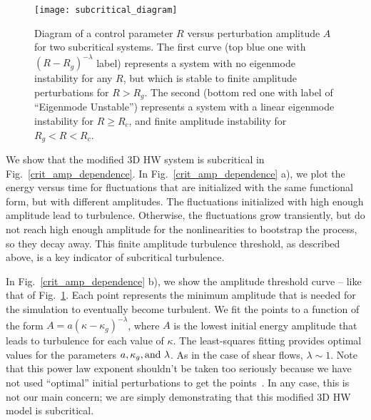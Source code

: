 \documentclass[twocolumn,showkeys,superscriptaddress]{revtex4}
\begin{document}
\begin{figure}
\centerline{\texttt{[image: subcritical\_diagram]}}
\caption{Diagram of a control parameter $R$ versus perturbation amplitude $A$ for two subcritical systems. The first curve (top blue one with $(R-R_g)^{-\lambda}$ label) represents a system with no
eigenmode instability for any $R$, but which is stable to finite amplitude perturbations for $R > R_g$. 
The second (bottom red one with label of ``Eigenmode Unstable'') represents a system with a linear eigenmode instability for $R \ge R_c$, and finite amplitude
instability for $R_g < R < R_c$.}
\label{subcritical_diagram}
\end{figure}

We show that the modified 3D HW system is subcritical in Fig.~\ref{crit_amp_dependence}. In Fig.~\ref{crit_amp_dependence} a), we plot the energy versus time for fluctuations that are initialized with the same functional form, but with
different amplitudes.
The fluctuations initialized with high enough amplitude lead to turbulence. 
Otherwise, the fluctuations grow transiently, but do not reach high enough amplitude for the nonlinearities to bootstrap the process, so they decay away. 
This finite amplitude turbulence threshold, as described above, is a key indicator of subcritical turbulence.

In Fig.~\ref{crit_amp_dependence} b), we show the amplitude threshold curve -- like that of Fig.~\ref{subcritical_diagram}. Each point represents the minimum amplitude that is needed for the simulation to eventually become
turbulent. We fit the points to a function of the form $A = a (\kappa - \kappa_g)^{- \lambda}$, 
where $A$ is the lowest initial energy amplitude that leads to turbulence for each value of $\kappa$. The least-squares fitting provides optimal values for the parameters $a, \kappa_g, \rm{and} \ \lambda$. 
As in the case of shear flows, $\lambda \sim 1$. Note that this power law exponent shouldn't be taken too seriously because we have not used ``optimal'' initial perturbations to get the points~\cite{cossu2005}. 
In any case, this is not our main concern; we are simply demonstrating that this modified 3D HW model is subcritical.
\end{document}
